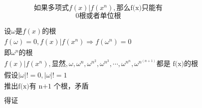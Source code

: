 \documentclass{ctexart}
\begin{document}
\fontsize{25.0pt}{\baselineskip}\selectfont

$$\mbox{如果多项式}f(x)|f(x^n), \mbox{那么f(x)只能有}$$
$$\mbox{0根或者单位根}$$

\newpage
{}
\fontsize{16.0pt}{\baselineskip}\selectfont

\begin{align*}
&\mbox{设}\omega\mbox{是}f(x)\mbox{的根}\\
&f(\omega) = 0 , f(x) | f(x^n)\Longrightarrow f(\omega^n) = 0\\
&\mbox{即}\omega^n\mbox{的根}\\
&f(x) | f(x^n),\mbox{显然},\omega,\omega^n,\omega^{n^2},\omega^{n^3},\cdots,\omega^{n^n},\omega^{n^(n+1)}\mbox{都是 f(x)的根}\\
&\mbox{假设} |\omega| != 0,|\omega| != 1\\
&\mbox{推出f(x)有 n+1 个根，矛盾}\\
&\\
&\mbox{得证}
\end{align*}
\end{document}
